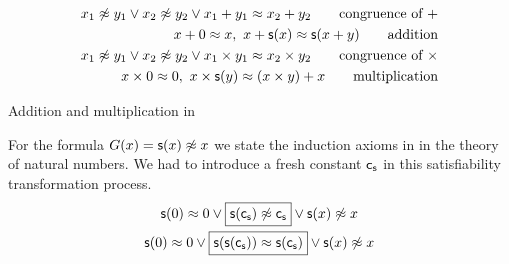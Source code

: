 \begin{table}[hbt]
	\begin{align*}
		x_1\not\approx y_1\lor x_2\not\approx y_2\lor x_1+y_1 \approx x_2+y_2
		\tag*{congruence of \(+\)}
		\\
		x + 0 \approx x,\
		x+\mathsf{s}(x) \approx \mathsf{s}(x+y)
		\tag*{addition}
		\\
		x_1\not\approx y_1\lor x_2\not\approx y_2\lor x_1\times y_1 \approx x_2\times y_2
		\tag*{congruence of \( \times \)}
		\\
		x \times 0 \approx 0,\
		x \times\mathsf{s}(y) \approx (x\times y) + x
		\tag*{multiplication}
	\end{align*}
	\caption{Addition and multiplication in \CNF}\label{tab:addition:multiplication}
\end{table}

\begin{example} For the formula \(G(x)=\mathsf{s}(x)\not\approx x\) we state the induction axioms in \CNF{} in the theory of natural numbers.
	We had to introduce a fresh constant \(\mathsf{c}_{\mathsf{s}}\) in this satisfiability transformation process.
	\begin{gather*}
	\mathsf{s}(0)\approx 0 \lor \boxed{\mathsf{s}(\mathsf{c}_{\mathsf{s}})\not\approx \mathsf{c}_{\mathsf{s}}} \lor \mathsf{s}(x)\not\approx x \\
	\mathsf{s}(0)\approx 0 \lor \boxed{\mathsf{s}(\mathsf{s}(\mathsf{c}_{\mathsf{s}}))\approx \mathsf{s}(\mathsf{c}_{\mathsf{s}})} \lor \mathsf{s}(x)\not\approx x
	\end{gather*}
\end{example}


